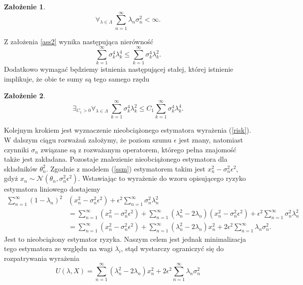 \documentclass[man,mfiu]{mgrwms}
\newtheorem{za}{Założenie}[chapter]
\begin{document}
\begin{za}\label{ass3}
\begin{displaymath}
\forall_{\lambda\in \Lambda}\ \sum_{n=1}^{\infty}\lambda_n\sigma_n^2<\infty.
\end{displaymath}
\end{za}
Z założenia \ref{ass2} wynika następująca nierówność
\begin{displaymath}
\sum_{k=1}^{\infty}\sigma_k^4\lambda_k^4\leq\sum_{k=1}^{\infty}\sigma_k^4\lambda_k^2.
\end{displaymath}
Dodatkowo wymagać będziemy istnienia następującej stałej, której istnienie implikuje, że obie te sumy są tego samego rzędu
\begin{za}
\begin{displaymath}\label{ass5}
\exists_{C_1>0}\forall_{\lambda\in \Lambda}\ \sum_{k=1}^{\infty}\sigma_k^4\lambda_k^2\leq C_1\sum_{k=1}^{\infty}\sigma_k^4\lambda_k^4.
\end{displaymath}
\end{za}
\indent Kolejnym krokiem jest wyznaczenie nieobciążonego estymatora wyrażenia (\ref{risk}). W dalszym ciągu rozważań założymy, że poziom szumu $\epsilon$ jest znany, natomiast czynniki $\sigma_n$ związane są z rozważanym operatorem, którego pełna znajomość także jest zakładana. Pozostaje znalezienie nieobciążonego estymatora dla składników $\theta_n^2$. Zgodnie z modelem (\ref{ssm}) estymatorem takim jest $x_n^2-\sigma_n^2\epsilon^2$, gdyż $x_n\sim \mathcal{N}(\theta_n,\sigma_n^2\epsilon^2)$. Wstawiając to wyrażenie do wzoru opisującego ryzyko estymatora liniowego dostajemy
\begin{displaymath}
\begin{split}
\sum_{n=1}^{\infty}(1-\lambda_n)^2&(x_n^2-\sigma_n^2\epsilon^2)+\epsilon^2\sum_{n=1}^{\infty}\sigma_n^2\lambda_n^2\\& =\sum_{n=1}^{\infty}(x_n^2-\sigma_n^2\epsilon^2)+ \sum_{n=1}^{\infty}(\lambda_n^2-2\lambda_n)(x_n^2-\sigma_n^2\epsilon^2) +\epsilon^2\sum_{n=1}^{\infty}\sigma_n^2\lambda_n^2\\&  = \sum_{n=1}^{\infty}(x_n^2-\sigma_n^2\epsilon^2)+\sum_{n=1}^{\infty}(\lambda_n^2-2\lambda_n)x_n^2+2\epsilon^2\sum_{n=1}^{\infty}\lambda_n\sigma_n^2.
\end{split}
\end{displaymath}
Jest to nieobciążony estymator ryzyka. Naszym celem jest jednak minimalizacja tego estymatora ze względu na wagi $\lambda_i$, stąd wystarczy ograniczyć się do rozpatrywania wyrażenia 
\begin{equation}\label{ure}
U(\lambda,X)=\sum_{n=1}^{\infty}(\lambda_n^2-2\lambda_n)x_n^2+2\epsilon^2\sum_{n=1}^{\infty}\lambda_n\sigma_n^2
\end{equation}
\end{document}
